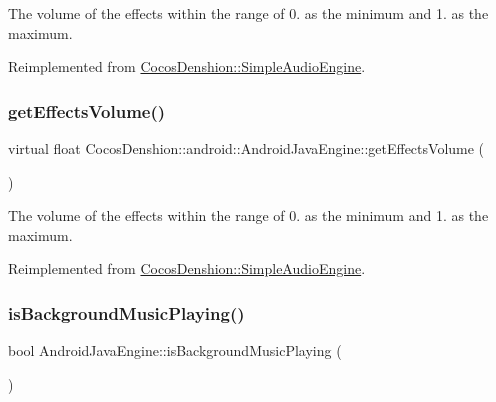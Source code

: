 The volume of the effects within the range of 0. as the minimum and 1. as the maximum. 

Reimplemented from \hyperlink{classCocosDenshion_1_1SimpleAudioEngine_a9bf72f162462408313d4e0085337e4ef}{Cocos\+Denshion\+::\+Simple\+Audio\+Engine}.

\mbox{\label{classCocosDenshion_1_1android_1_1AndroidJavaEngine_aea7bc49b13e8823e9a64c9117d44fc09}} 
\subsubsection{\texorpdfstring{get\+Effects\+Volume()}{getEffectsVolume()}\hspace{0.1cm}{\footnotesize\ttfamily [2/2]}}
{\footnotesize\ttfamily virtual float Cocos\+Denshion\+::android\+::\+Android\+Java\+Engine\+::get\+Effects\+Volume (\begin{DoxyParamCaption}{ }\end{DoxyParamCaption})\hspace{0.3cm}{\ttfamily [virtual]}}

The volume of the effects within the range of 0. as the minimum and 1. as the maximum. 

Reimplemented from \hyperlink{classCocosDenshion_1_1SimpleAudioEngine_a9bf72f162462408313d4e0085337e4ef}{Cocos\+Denshion\+::\+Simple\+Audio\+Engine}.

\mbox{\label{classCocosDenshion_1_1android_1_1AndroidJavaEngine_a2bfbe26dae6b6a8a18fcd3e6e97f0c7e}} 
\subsubsection{\texorpdfstring{is\+Background\+Music\+Playing()}{isBackgroundMusicPlaying()}\hspace{0.1cm}{\footnotesize\ttfamily [1/2]}}
{\footnotesize\ttfamily bool Android\+Java\+Engine\+::is\+Background\+Music\+Playing (\begin{DoxyParamCaption}{ }\end{DoxyParamCaption})\hspace{0.3cm}{\ttfamily [virtual]}}

